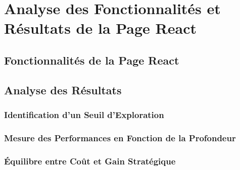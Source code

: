 \section{Analyse des Fonctionnalités et Résultats de la Page React}

\subsection{Fonctionnalités de la Page React}

\subsection{Analyse des Résultats}
\subsubsection{Identification d'un Seuil d'Exploration}
\subsubsection{Mesure des Performances en Fonction de la Profondeur}
\subsubsection{Équilibre entre Coût et Gain Stratégique}